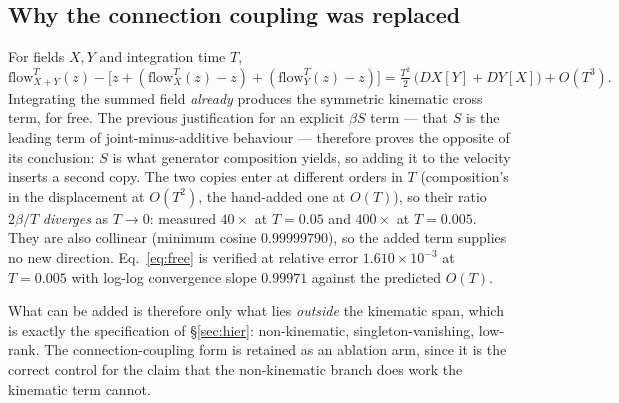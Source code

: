 \documentclass{article}
\begin{document}
\subsection{Why the connection coupling was replaced}
\label{sec:doublecount}

For fields $X, Y$ and integration time $T$,
\begin{equation}
\mathrm{flow}_{X+Y}^{T}(z) - \bigl[z + (\mathrm{flow}_{X}^{T}(z) - z) + (\mathrm{flow}_{Y}^{T}(z) - z)\bigr]
= \tfrac{T^{2}}{2}\,\bigl(DX[Y] + DY[X]\bigr) + O(T^{3}).
\label{eq:free}
\end{equation}
Integrating the summed field \emph{already} produces the symmetric kinematic cross term, for
free. The previous justification for an explicit $\beta S$ term --- that $S$ is the leading
term of joint-minus-additive behaviour --- therefore proves the opposite of its conclusion:
$S$ is what generator composition yields, so adding it to the velocity inserts a second copy.
The two copies enter at different orders in $T$ (composition's in the displacement at
$O(T^{2})$, the hand-added one at $O(T)$), so their ratio $2\beta/T$ \emph{diverges} as
$T \to 0$: measured $40\times$ at $T = 0.05$ and $400\times$ at $T = 0.005$. They are also
collinear (minimum cosine $0.99999790$), so the added term supplies no new direction.
Eq.~\ref{eq:free} is verified at relative error $1.610\times10^{-3}$ at $T = 0.005$ with
log-log convergence slope $0.99971$ against the predicted $O(T)$.

What can be added is therefore only what lies \emph{outside} the kinematic span, which is
exactly the specification of \S\ref{sec:hier}: non-kinematic, singleton-vanishing, low-rank.
The connection-coupling form is retained as an ablation arm, since it is the correct control
for the claim that the non-kinematic branch does work the kinematic term cannot.
\end{document}
